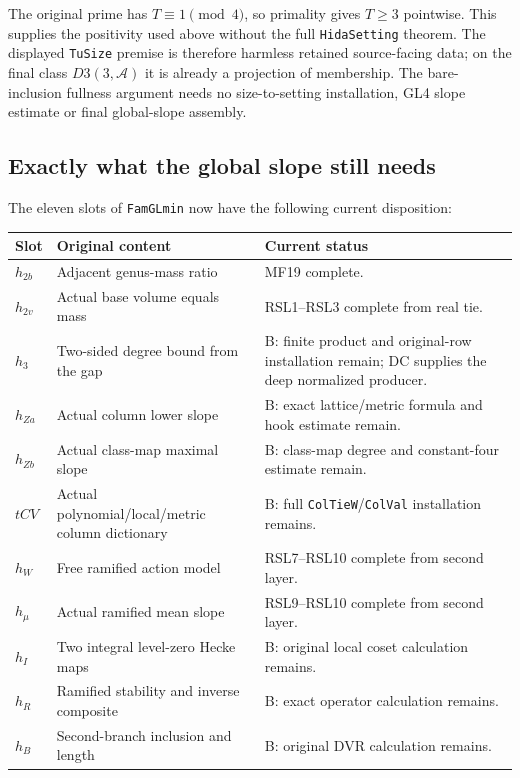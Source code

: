 The original prime has $T\equiv1\pmod4$, so primality gives $T\ge3$
pointwise. This supplies the positivity used above without the full
\texttt{HidaSetting} theorem. The displayed \texttt{TuSize} premise is
therefore harmless retained source-facing data; on the final class
$D3(3,\mathcal A)$ it is already a projection of membership.
The bare-inclusion fullness argument needs no size-to-setting
installation, GL4 slope estimate or final global-slope assembly.

\subsection{Exactly what the global slope still needs}

The eleven slots of \texttt{FamGLmin} now have the following
current disposition:
\begin{longtable}{p{}p{}p{}}
\textbf{Slot}&\textbf{Original content}&\textbf{Current status}\\\hline
$h_{2b}$&Adjacent genus-mass ratio&MF19 complete.\\
$h_{2v}$&Actual base volume equals mass&RSL1--RSL3 complete from real tie.\\
$h_3$&Two-sided degree bound from the gap&B: finite product and original-row installation remain; DC supplies the deep normalized producer.\\
$h_{Za}$&Actual column lower slope&B: exact lattice/metric formula and hook estimate remain.\\
$h_{Zb}$&Actual class-map maximal slope&B: class-map degree and constant-four estimate remain.\\
$tCV$&Actual polynomial/local/metric column dictionary&B: full \texttt{ColTieW}/\texttt{ColVal} installation remains.\\
$h_W$&Free ramified action model&RSL7--RSL10 complete from second layer.\\
$h_\mu$&Actual ramified mean slope&RSL9--RSL10 complete from second layer.\\
$h_I$&Two integral level-zero Hecke maps&B: original local coset calculation remains.\\
$h_R$&Ramified stability and inverse composite&B: exact operator calculation remains.\\
$h_B$&Second-branch inclusion and length&B: original DVR calculation remains.\\
\end{longtable}

